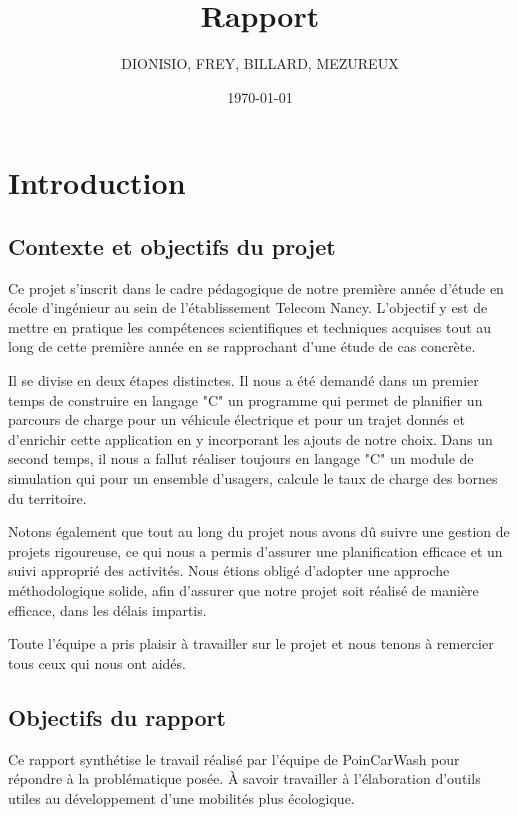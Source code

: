 \documentclass[a4paper, 12pt]{report}
\title{Rapport}
\author{DIONISIO, FREY, BILLARD, MEZUREUX}
\date{\today}
\begin{document}
\maketitle
\dominitoc
{}
\tableofcontents

\chapter{Introduction}
\minitoc
{}
\clearpage

\section{Contexte et objectifs du projet}

Ce projet s'inscrit dans le cadre pédagogique de notre première année d'étude en école d'ingénieur au sein de l'établissement Telecom Nancy. L'objectif y est de mettre en pratique les compétences scientifiques et techniques acquises tout au long de cette première année en se rapprochant d'une étude de cas concrète.
\bigskip

Il se divise en deux étapes distinctes. Il nous a été demandé dans un premier temps de construire en langage "C" un programme qui permet de planifier un parcours de charge pour un véhicule électrique et pour un trajet donnés et d'enrichir cette application en y incorporant les ajouts de notre choix. Dans un second temps, il nous a fallut réaliser toujours en langage "C" un module de simulation qui pour un ensemble d'usagers, calcule le taux de charge des bornes du territoire.
\bigskip

Notons également que tout au long du projet nous avons dû suivre une gestion de projets rigoureuse, ce
qui nous a permis d’assurer une planification efficace et un suivi approprié des activités. Nous étions
obligé d'adopter une approche méthodologique solide, afin d’assurer que notre projet soit réalisé de manière efficace, dans les délais impartis.
\bigskip

Toute l’équipe a pris plaisir à travailler sur le projet et nous tenons à remercier tous ceux qui nous
ont aidés.

\section{Objectifs du rapport}

Ce rapport synthétise le travail réalisé par l'équipe de PoinCarWash pour répondre à la problématique posée. À savoir travailler à l'élaboration d'outils utiles au développement d'une mobilités plus écologique.
\end{document}
